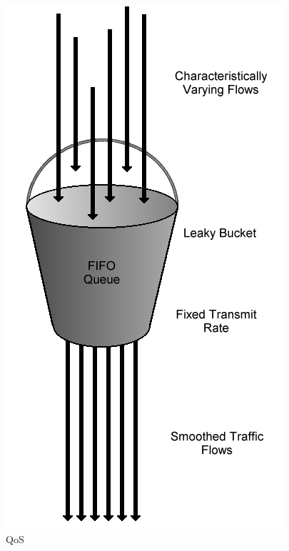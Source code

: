 \documentclass[]{beamer}
\begin{document}
\begin{frame}
  \begin{figure}[hbtp]
   \caption{QoS}
   \begin{center}
    \includegraphics[scale=0.2]{leakybucket2.png}
   \end{center}
  \end{figure}
\end{frame}



\end{document}
